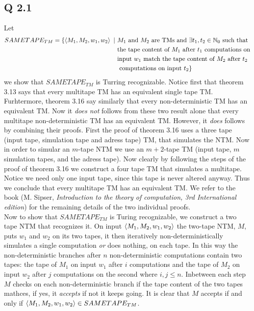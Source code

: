 \documentclass[a4paper,11pt]{article}
\numberwithin{equation}{section}
\begin{document}
\subsection*{Q 2.1}
Let \begin{equation*}
\begin{aligned}
SAMETAPE_{TM}=\{\braket{M_1,M_2,w_1,w_2}\ \vert\  &M_1 \text{ and }  M_2 \text{ are TMs and } \exists  t_1,t_2\in \mathbb{N}_0\text{ such that}\\ &\text{the tape content of } M_1 \text{ after } t_1 \text{ computations on}\\&\text{input } w_1 \text{ match the tape content of } M_2 \text{ after } t_2\\& \text{ computations on input } t_2 \}
\end{aligned}
\end{equation*}
we show that $ SAMETAPE_{TM} $ is Turring recognizable. Notice first that theorem 3.13 says that every multitape TM has an equivalent single tape TM. Furhtermore, theorem 3.16 say similarly that every non-deterministic TM has an equivalent TM. Now it \emph{does not} follows from these two result alone that every multitape non-deterministic TM has an equivalent TM. However, it \emph{does} follows by combining their proofs. First the proof of theorem 3.16 uses a three tape (input tape, simulation tape and adress tape) TM, that simulates the NTM. Now in order to simular an $ m $-tape NTM we use an $ m+2 $-tape TM (input tape, $ m $ simulation tapes, and the adress tape). Now clearly by following the steps of the proof of theorem 3.16 we construct a four tape TM that simulates a multitape. Notice we need only one input tape, since this tape is never altered anyway. Thus we conclude that every multitape TM has an equivalent TM. We refer to the book (M. Sipser, \emph{Introduction to the theory of computation, 3rd International edition}) for the remaining details of the two individual proofs.
\\
Now to show that $ SAMETAPE_{TM} $ is Turing recognizable, we construct a two tape NTM that recognizes it. On input $ \braket{M_1,M_2,w_1,w_2} $ the two-tape NTM, $ M $, puts $ w_1 $ and $ w_2 $ on its two tapes, it then iteratively non-deterministically simulates a single computation \emph{or} does nothing, on each tape. In this way the non-deterministic branches after $ n $ non-deterministic computations contain two tapes: the tape of $ M_1 $ on input $ w_1 $ after $ i $ computations and the tape of $ M_2 $ on input $ w_2 $ after $ j $ computations on the second where $ i,j\leq n $. Inbetween each step $ M $ checks on each non-deterministic branch if the tape content of the two tapes mathces, if yes, it \emph{accepts} if not it keeps going. It is clear that $ M $ accepts if and only if $ \braket{M_1,M_2,w_1,w_2}\in SAMETAPE_{TM} $.
\end{document}
